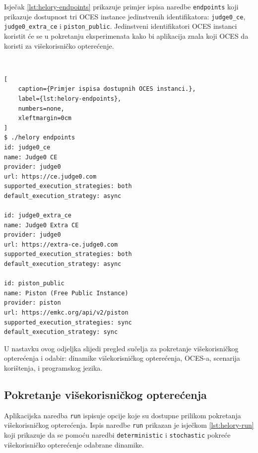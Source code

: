 \documentclass[times, utf8, diplomski]{fer}
\begin{document}
\pagebreak

Isječak \ref{lst:helory-endpoints} prikazuje primjer ispisa naredbe \lstinline{endpoints} koji prikazuje dostupnost tri OCES instance jedinstvenih identifikatora: \lstinline{judge0_ce}, \lstinline{judge0_extra_ce} i \lstinline{piston_public}. Jedinstveni identifikatori OCES instanci koristit će se u pokretanju eksperimenata kako bi aplikacija znala koji OCES da koristi za višekorisničko opterećenje.

\

\begin{lstlisting}[
    caption={Primjer ispisa dostupnih OCES instanci.},
    label={lst:helory-endpoints},
    numbers=none,
    xleftmargin=0cm
]
$ ./helory endpoints
id: judge0_ce
name: Judge0 CE
provider: judge0
url: https://ce.judge0.com
supported_execution_strategies: both
default_execution_strategy: async

id: judge0_extra_ce
name: Judge0 Extra CE
provider: judge0
url: https://extra-ce.judge0.com
supported_execution_strategies: both
default_execution_strategy: async

id: piston_public
name: Piston (Free Public Instance)
provider: piston
url: https://emkc.org/api/v2/piston
supported_execution_strategies: sync
default_execution_strategy: sync
\end{lstlisting}

U nastavku ovog odjeljka slijedi pregled sučelja za pokretanje višekorisničkog opterećenja i odabir: dinamike višekorisničkog opterećenja, OCES-a, scenarija korištenja, i programskog jezika.

\pagebreak

\subsection{Pokretanje višekorisničkog opterećenja}
Aplikacijska naredba \lstinline{run} ispisuje opcije  koje su dostupne prilikom pokretanja višekorisničkog opterećenja. Ispis naredbe \lstinline{run} prikazan je isječkom \ref{lst:helory-run} koji prikazuje da se pomoću naredbi \lstinline{deterministic} i \lstinline{stochastic} pokreće višekorisničko opterećenje odabrane dinamike.

\
\end{document}

